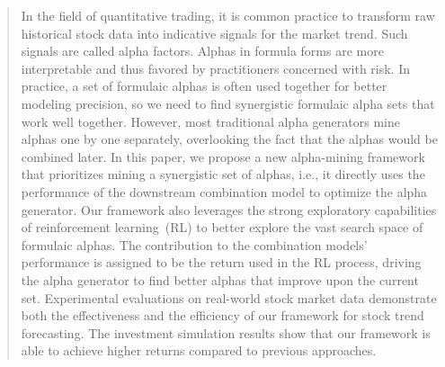 \begin{abstract}
    In the field of quantitative trading, it is common practice to transform raw historical stock data into indicative signals for the market trend. Such signals are called alpha factors. Alphas in formula forms are more interpretable and thus favored by practitioners concerned with risk. In practice, a set of formulaic alphas is often used together for better modeling precision, so we need to find synergistic formulaic alpha sets that work well together. However, most traditional alpha generators mine alphas one by one separately, overlooking the fact that the alphas would be combined later. In this paper, we propose a new alpha-mining framework that prioritizes mining a synergistic set of alphas, i.e., it directly uses the performance of the downstream combination model to optimize the alpha generator. Our framework also leverages the strong exploratory capabilities of reinforcement learning~(RL) to better explore the vast search space of formulaic alphas. The contribution to the combination models' performance is assigned to be the return used in the RL process, driving the alpha generator to find better alphas that improve upon the current set. Experimental evaluations on real-world stock market data demonstrate both the effectiveness and the efficiency of our framework for stock trend forecasting. The investment simulation results show that our framework is able to achieve higher returns compared to previous approaches.
\end{abstract}